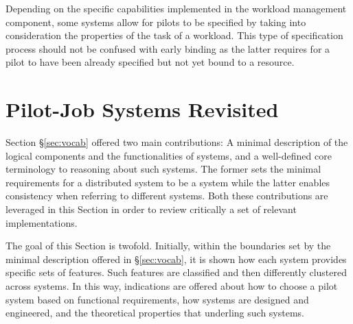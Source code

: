 \documentclass{sig-alternate}
\begin{document}
Depending on the specific capabilities implemented in the workload management
component, some \pilotjob systems allow for pilots to be specified by taking
into consideration the properties of the task of a workload. This type of
specification process should not be confused with early binding as the latter
requires for a pilot to have been already specified but not yet bound to a
resource.

\section{Pilot-Job Systems Revisited}\label{sec:4}

Section \S\ref{sec:vocab} offered two main contributions: A minimal description
of the logical components and the functionalities of \pilotjob systems, and a
well-defined core terminology to reasoning about such systems. The former sets
the minimal requirements for a distributed system to be a \pilotjob system
while the latter enables consistency when referring to different \pilotjob
systems. Both these contributions are leveraged in this Section in order to
review critically a set of relevant \pilotjob implementations.

The goal of this Section is twofold. Initially, within the boundaries set by
the minimal description offered in \S\ref{sec:vocab}, it is shown how each
\pilotjob system provides specific sets of features. Such features are
classified and then differently clustered across \pilotjob systems. In this
way, indications are offered about how to choose a pilot system based on
functional requirements, how \pilotjob systems are designed and engineered, and
the theoretical properties that underling such systems.



\end{document}

